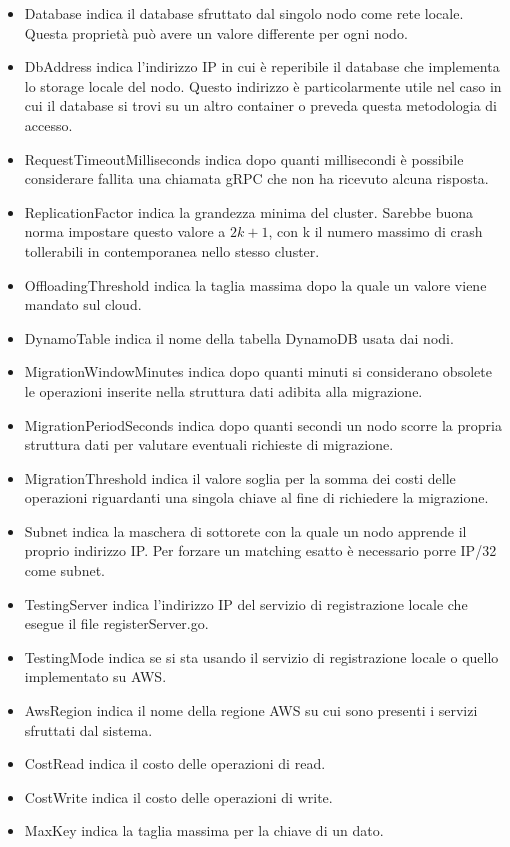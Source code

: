\documentclass[conference]{IEEEtran}
\begin{document}
\begin{itemize}
  \item {Database} indica il database sfruttato dal singolo nodo come rete locale. Questa proprietà può avere un valore
differente per ogni nodo.
  \item {DbAddress} indica l'indirizzo IP in cui è reperibile il database che implementa lo storage locale del nodo.
Questo indirizzo è particolarmente utile nel caso in cui il database si trovi su un altro container o preveda questa metodologia
di accesso.
  \item {RequestTimeoutMilliseconds} indica dopo quanti millisecondi è possibile considerare fallita una chiamata gRPC che non
ha ricevuto alcuna risposta.
  \item {ReplicationFactor} indica la grandezza minima del cluster. Sarebbe buona norma impostare questo valore a \(2k + 1\),
con k il numero massimo di crash tollerabili in contemporanea nello stesso cluster.
  \item {OffloadingThreshold} indica la taglia massima dopo la quale un valore viene mandato sul cloud.
  \item {DynamoTable} indica il nome della tabella DynamoDB usata dai nodi.
  \item {MigrationWindowMinutes} indica dopo quanti minuti si considerano obsolete le operazioni inserite nella struttura dati
adibita alla migrazione.
  \item {MigrationPeriodSeconds} indica dopo quanti secondi un nodo scorre la propria struttura dati per valutare eventuali
richieste di migrazione.
  \item {MigrationThreshold} indica il valore soglia per la somma dei costi delle operazioni riguardanti una singola chiave
al fine di richiedere la migrazione.
  \item {Subnet} indica la maschera di sottorete con la quale un nodo apprende il proprio indirizzo IP. Per forzare un
matching esatto è necessario porre IP/32 come subnet.
  \item {TestingServer} indica l'indirizzo IP del servizio di registrazione locale che esegue il file registerServer.go.
  \item {TestingMode} indica se si sta usando il servizio di registrazione locale o quello implementato su AWS.
  \item {AwsRegion} indica il nome della regione AWS su cui sono presenti i servizi sfruttati dal sistema.
  \item {CostRead} indica il costo delle operazioni di read.
  \item {CostWrite} indica il costo delle operazioni di write.
  \item {MaxKey} indica la taglia massima per la chiave di un dato.
\end{itemize}
\end{document}
